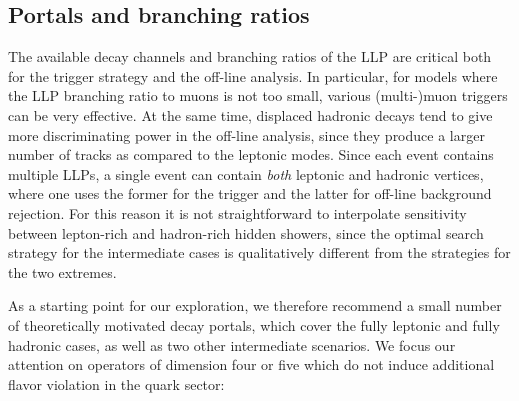 \subsection{Portals and branching ratios}
\label{sec:darkshowerportal}

The available decay channels and branching ratios of the LLP are critical both for the trigger strategy and the off-line analysis. In particular, for models where the LLP branching ratio to muons is not too small,  various (multi-)muon triggers can be very effective. At the same time, displaced hadronic decays tend to give more discriminating power in the off-line analysis, since they produce a larger number of tracks as compared to the leptonic modes. Since each event contains multiple LLPs, a single event can contain \emph{both} leptonic and hadronic vertices, where one uses the former for the trigger and the latter for off-line background rejection. For this reason it is not straightforward to interpolate  sensitivity between lepton-rich and hadron-rich hidden showers, since the optimal search strategy for the intermediate cases is qualitatively different from the strategies for the two extremes.

As a starting point for our exploration, we therefore recommend a small number of theoretically motivated decay portals, which cover the fully leptonic and fully hadronic cases, as well as two other intermediate scenarios. We focus our attention on operators of dimension four or five which do not induce additional flavor violation in the quark sector:

